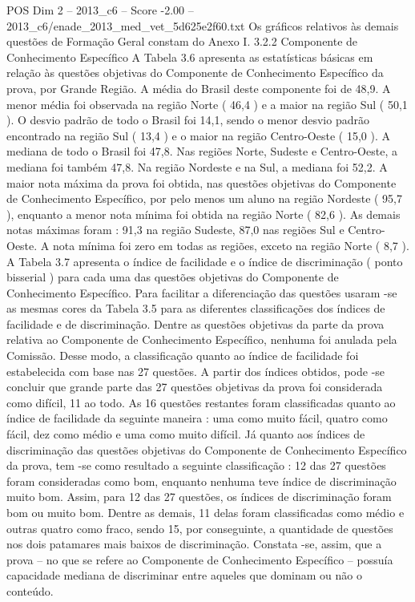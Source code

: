 \begin{textsample}{POS Dim 2 – 2013\_c6 – Score -2.00 – 2013\_c6/enade\_2013\_med\_vet\_5d625e2f60.txt}
Os gráficos relativos às demais questões de Formação Geral constam do Anexo I. 3.2.2 Componente de Conhecimento Específico A Tabela 3.6 apresenta as estatísticas básicas em relação às questões objetivas do Componente de Conhecimento Específico da prova, por Grande Região.
A média do Brasil deste componente foi de 48,9.
A menor média foi observada na região Norte ( 46,4 ) e a maior na região Sul ( 50,1 ).
O desvio padrão de todo o Brasil foi 14,1, sendo o menor desvio padrão encontrado na região Sul ( 13,4 ) e o maior na região Centro-Oeste ( 15,0 ).
A mediana de todo o Brasil foi 47,8.
Nas regiões Norte, Sudeste e Centro-Oeste, a mediana foi também 47,8.
Na região Nordeste e na Sul, a mediana foi 52,2.
A maior nota máxima da prova foi obtida, nas questões objetivas do Componente de Conhecimento Específico, por pelo menos um aluno na região Nordeste ( 95,7 ), enquanto a menor nota mínima foi obtida na região Norte ( 82,6 ).
As demais notas máximas foram : 91,3 na região Sudeste, 87,0 nas regiões Sul e Centro-Oeste.
A nota mínima foi zero em todas as regiões, exceto na região Norte ( 8,7 ).
A Tabela 3.7 apresenta o índice de facilidade e o índice de discriminação ( ponto bisserial ) para cada uma das questões objetivas do Componente de Conhecimento Específico.
Para facilitar a diferenciação das questões usaram -se as mesmas cores da Tabela 3.5 para as diferentes classificações dos índices de facilidade e de discriminação.
Dentre as questões objetivas da parte da prova relativa ao Componente de Conhecimento Específico, nenhuma foi anulada pela Comissão.
Desse modo, a classificação quanto ao índice de facilidade foi estabelecida com base nas 27 questões.
A partir dos índices obtidos, pode -se concluir que grande parte das 27 questões objetivas da prova foi considerada como difícil, 11 ao todo.
As 16 questões restantes foram classificadas quanto ao índice de facilidade da seguinte maneira : uma como muito fácil, quatro como fácil, dez como médio e uma como muito difícil.
Já quanto aos índices de discriminação das questões objetivas do Componente de Conhecimento Específico da prova, tem -se como resultado a seguinte classificação : 12 das 27 questões foram consideradas como bom, enquanto nenhuma teve índice de discriminação muito bom.
Assim, para 12 das 27 questões, os índices de discriminação foram bom ou muito bom.
Dentre as demais, 11 delas foram classificadas como médio e outras quatro como fraco, sendo 15, por conseguinte, a quantidade de questões nos dois patamares mais baixos de discriminação.
Constata -se, assim, que a prova – no que se refere ao Componente de Conhecimento Específico – possuía capacidade mediana de discriminar entre aqueles que dominam ou não o conteúdo.

\end{textsample}
